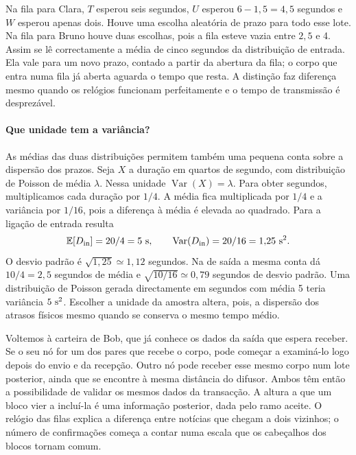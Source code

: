 Na fila para Clara, \(T\) esperou seis segundos, \(U\) esperou
\(6-1{,}5=4{,}5\) segundos e \(W\) esperou apenas dois. Houve
uma escolha aleatória de prazo para todo esse lote. Na fila para Bruno
houve duas escolhas, pois a fila esteve vazia entre \(2{,}5\) e 4.
Assim se lê correctamente a média de cinco segundos da distribuição
de entrada. Ela vale para um novo prazo, contado a partir da abertura
da fila; o corpo que entra numa fila já aberta aguarda o tempo que
resta. A distinção faz diferença mesmo quando os relógios funcionam
perfeitamente e o tempo de transmissão é desprezável.

\paragraph{Que unidade tem a variância?}
As médias das duas distribuições permitem também uma pequena conta
sobre a dispersão dos prazos. Seja \(X\) a duração em quartos de
segundo, com distribuição de Poisson de média \(\lambda\). Nessa
unidade \(\operatorname{Var}(X)=\lambda\). Para obter segundos,
multiplicamos cada duração por \(1/4\). A média fica multiplicada
por \(1/4\) e a variância por \(1/16\), pois a diferença à média é
elevada ao quadrado. Para a ligação de entrada resulta
\[
  \mathbb E[D_{\rm in}]=20/4=5\ {\rm s},\qquad
  \operatorname{Var}(D_{\rm in})=20/16=1{,}25\ {\rm s}^2 .
\]
O desvio padrão é \(\sqrt{1{,}25}\simeq1{,}12\) segundos. Na de
saída a mesma conta dá \(10/4=2{,}5\) segundos de média e
\(\sqrt{10/16}\simeq0{,}79\) segundos de desvio padrão. Uma
distribuição de Poisson gerada directamente em segundos com média 5
teria variância \(5\ {\rm s}^2\). Escolher a unidade da amostra
altera, pois, a dispersão dos atrasos físicos mesmo quando se conserva
o mesmo tempo médio.

Voltemos à carteira de Bob, que já conhece os dados da saída que espera
receber. Se o seu nó for um dos pares que recebe o corpo, pode começar
a examiná-lo logo depois do envio e da recepção. Outro nó pode receber
esse mesmo corpo num lote posterior, ainda que se encontre à mesma
distância do difusor. Ambos têm então a possibilidade de validar os
mesmos dados da transacção. A altura a que um bloco vier a incluí-la
é uma informação posterior, dada pelo ramo aceite. O relógio das filas
explica a diferença entre notícias que chegam a dois vizinhos; o
número de confirmações começa a contar numa escala que os cabeçalhos
dos blocos tornam comum.
